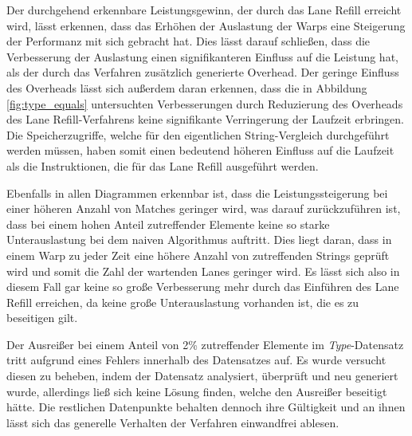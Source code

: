 Der durchgehend erkennbare Leistungsgewinn, der durch das Lane Refill erreicht wird, lässt erkennen, dass das Erhöhen der Auslastung der Warps eine Steigerung der Performanz mit sich gebracht hat.
Dies lässt darauf schließen, dass die Verbesserung der Auslastung einen signifikanteren Einfluss auf die Leistung hat, als der durch das Verfahren zusätzlich generierte Overhead.
Der geringe Einfluss des Overheads lässt sich außerdem daran erkennen, dass die in Abbildung \ref{fig:type_equals} untersuchten Verbesserungen durch Reduzierung des Overheads des Lane Refill-Verfahrens keine signifikante Verringerung der Laufzeit erbringen.
Die Speicherzugriffe, welche für den eigentlichen String-Vergleich durchgeführt werden müssen, haben somit einen bedeutend höheren Einfluss auf die Laufzeit als die Instruktionen, die für das Lane Refill ausgeführt werden.

Ebenfalls in allen Diagrammen erkennbar ist, dass die Leistungssteigerung bei einer höheren Anzahl von Matches geringer wird, was darauf zurückzuführen ist, dass bei einem hohen Anteil zutreffender Elemente keine so starke Unterauslastung bei dem naiven Algorithmus auftritt.
Dies liegt daran, dass in einem Warp zu jeder Zeit eine höhere Anzahl von zutreffenden Strings geprüft wird und somit die Zahl der wartenden Lanes geringer wird.
Es lässt sich also in diesem Fall gar keine so große Verbesserung mehr durch das Einführen des Lane Refill erreichen, da keine große Unterauslastung vorhanden ist, die es zu beseitigen gilt.

Der Ausreißer bei einem Anteil von 2\% zutreffender Elemente im \emph{Type}-Datensatz tritt aufgrund eines Fehlers innerhalb des Datensatzes auf.
Es wurde versucht diesen zu beheben, indem der Datensatz analysiert, überprüft und neu generiert wurde, allerdings ließ sich keine Lösung finden, welche den Ausreißer beseitigt hätte.
Die restlichen Datenpunkte behalten dennoch ihre Gültigkeit und an ihnen lässt sich das generelle Verhalten der Verfahren einwandfrei ablesen.

